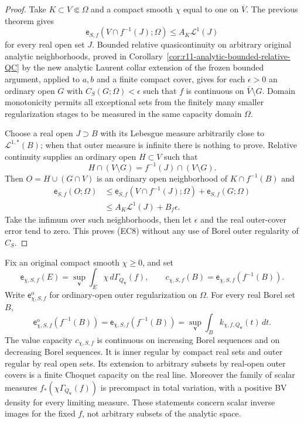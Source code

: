 \begin{proof}
Take $K\subset V\Subset\Omega$ and a compact smooth $\chi$
equal to one on $\overline V$.  The previous theorem gives
\[
 \mathsf e_{S,f}(V\cap f^{-1}(J);\Omega)
                                  \le A_K\mathcal L^1(J)
 \tag{EC9}
\]
for every real open set $J$.  Bounded relative quasicontinuity
on arbitrary original analytic neighborhoods, proved in
Corollary~\ref{cor:r11-analytic-bounded-relative-QC} by the new
analytic Laurent collar extension of the frozen bounded argument,
applied to $a,b$ and a finite compact cover, gives for each
$\epsilon>0$ an ordinary open $G$
with $C_S(G;\Omega)<\epsilon$ such that $f$ is continuous
on $\overline V\setminus G$.  Domain monotonicity permits all
exceptional sets from the finitely many smaller regularization
stages to be measured in the same capacity domain $\Omega$.

Choose a real open $J\supset B$ with its Lebesgue measure
arbitrarily close to $\mathcal L^{1,*}(B)$; when that outer
measure is infinite there is nothing to prove.  Relative
continuity supplies an ordinary open $H\subset V$ such that
\[
 H\cap(V\setminus G)
       = f^{-1}(J)\cap(V\setminus G).
\]
Then $O=H\cup(G\cap V)$ is an ordinary open neighborhood of
$K\cap f^{-1}(B)$ and
\[
 \begin{split}
 \mathsf e_{S,f}(O;\Omega)
 &\le\mathsf e_{S,f}(V\cap f^{-1}(J);\Omega)
                              +\mathsf e_{S,f}(G;\Omega)\\
 &\le A_K\mathcal L^1(J)+B_f\epsilon.
 \end{split}
\]
Take the infimum over such neighborhoods, then let $\epsilon$
and the real outer-cover error tend to zero.  This proves
(EC8) without any use of Borel outer regularity of $C_S$.
\end{proof}

\begin{proposition}
\label{prop:r11-scalar-energy-outer-regularity}
Fix an original compact smooth $\chi\geq0$, and set
\[
 \mathsf e_{\chi,S,f}(E)
   =\sup_{\mathbf v}\int_E\chi\,d\Gamma_{Q_{\mathbf v}}(f),
 \qquad
 c_{\chi,S,f}(B)=\mathsf e_{\chi,S,f}(f^{-1}(B)).
 \tag{EC12}
\]
Write $\mathsf e_{\chi,S,f}^{\mathrm o}$ for ordinary-open outer
regularization on $\Omega$.  For every real Borel set $B$,
\[
 \mathsf e_{\chi,S,f}^{\mathrm o}(f^{-1}(B))
       =\mathsf e_{\chi,S,f}(f^{-1}(B))
       =\sup_{\mathbf v}\int_B k_{\chi,f,Q_{\mathbf v}}(t)\,dt.
 \tag{EC13}
\]
The value capacity $c_{\chi,S,f}$ is continuous on increasing
Borel sequences and on decreasing Borel sequences.  It is inner
regular by compact real sets and outer regular by real open sets.
Its extension to arbitrary subsets by real-open outer covers is
a finite Choquet capacity on the real line.
Moreover the family of scalar measures
$f_*(\chi\Gamma_{Q_{\mathbf v}}(f))$ is precompact in total
variation, with a positive BV density for every limiting measure.
These statements concern scalar inverse images for the fixed $f$,
not arbitrary subsets of the analytic space.
\end{proposition}

